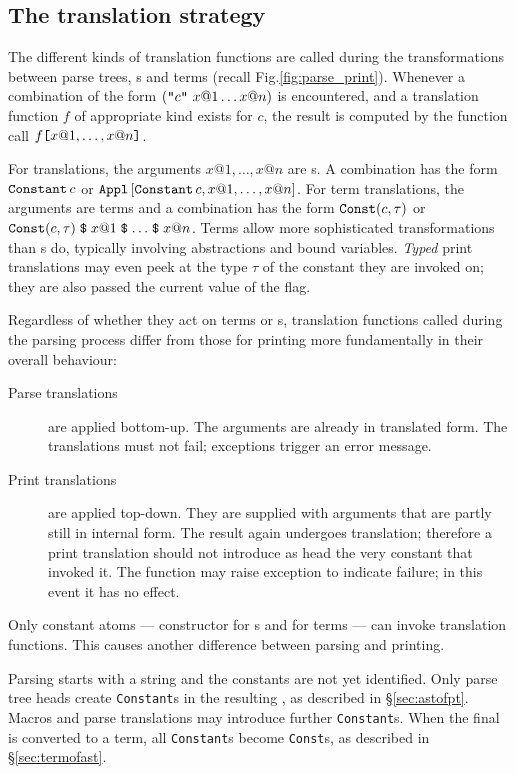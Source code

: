 \subsection{The translation strategy}
The different kinds of translation functions are called during the
transformations between parse trees, \AST{}s and terms (recall
Fig.\ts\ref{fig:parse_print}).  Whenever a combination of the form
$(\mbox{\tt "}c\mbox{\tt "}~x@1 \ldots x@n)$ is encountered, and a translation
function $f$ of appropriate kind exists for $c$, the result is
computed by the \ML{} function call $f \mbox{\tt [} x@1, \ldots, x@n \mbox{\tt ]}$.

For \AST{} translations, the arguments $x@1, \ldots, x@n$ are \AST{}s.
A combination has the form $\mathop{\mbox{\tt Constant}}\nolimits c$ or $\mathop{\mbox{\tt Appl}}\nolimits\,[\mathop{\mbox{\tt Constant}}\nolimits c, x@1,
  \ldots, x@n]$.  For term translations, the arguments are terms and a
combination has the form $\mathop{\mbox{\tt Const}}\nolimits (c, \tau)$ or $\mathop{\mbox{\tt Const}}\nolimits
(c, \tau) \mathrel{\hbox{\tt\$}} x@1 \mathrel{\hbox{\tt\$}} \ldots \mathrel{\hbox{\tt\$}} x@n$.  Terms allow more
sophisticated transformations than \AST{}s do, typically involving
abstractions and bound variables. {\em Typed} print translations may
even peek at the type $\tau$ of the constant they are invoked on; they
are also passed the current value of the  flag.

Regardless of whether they act on terms or \AST{}s, translation
functions called during the parsing process differ from those for
printing more fundamentally in their overall behaviour:
\begin{description}
\item[Parse translations] are applied bottom-up.  The arguments are already
  in translated form.  The translations must not fail; exceptions trigger
  an error message.

\item[Print translations] are applied top-down.  They are supplied with
  arguments that are partly still in internal form.  The result again
  undergoes translation; therefore a print translation should not introduce
  as head the very constant that invoked it.  The function may raise
  exception  to indicate failure; in this event it has no
  effect.
\end{description}

Only constant atoms --- constructor  for \AST{}s and
 for terms --- can invoke translation functions.  This
causes another difference between parsing and printing.

Parsing starts with a string and the constants are not yet identified.
Only parse tree heads create {\tt Constant}s in the resulting \AST, as
described in \S\ref{sec:astofpt}.  Macros and parse \AST{} translations may
introduce further {\tt Constant}s.  When the final \AST{} is converted to a
term, all {\tt Constant}s become {\tt Const}s, as described in
\S\ref{sec:termofast}.

